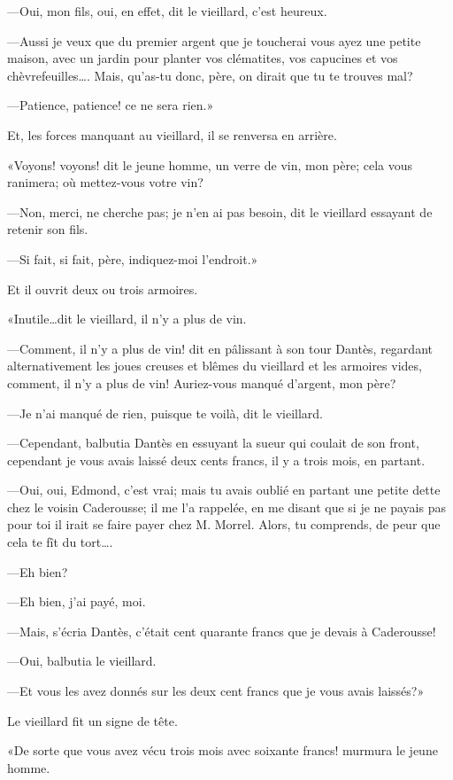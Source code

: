—Oui, mon fils, oui, en effet, dit le vieillard, c'est heureux.

—Aussi je veux que du premier argent que je toucherai vous ayez une petite maison, avec un jardin pour planter vos clématites, vos capucines et vos chèvrefeuilles\dots. Mais, qu'as-tu donc, père, on dirait que tu te trouves mal?

—Patience, patience! ce ne sera rien.»

Et, les forces manquant au vieillard, il se renversa en arrière.

«Voyons! voyons! dit le jeune homme, un verre de vin, mon père; cela vous ranimera; où mettez-vous votre vin?

—Non, merci, ne cherche pas; je n'en ai pas besoin, dit le vieillard essayant de retenir son fils.

—Si fait, si fait, père, indiquez-moi l'endroit.»

Et il ouvrit deux ou trois armoires.

«Inutile\dots dit le vieillard, il n'y a plus de vin.

—Comment, il n'y a plus de vin! dit en pâlissant à son tour Dantès, regardant alternativement les joues creuses et blêmes du vieillard et les armoires vides, comment, il n'y a plus de vin! Auriez-vous manqué d'argent, mon père?

—Je n'ai manqué de rien, puisque te voilà, dit le vieillard.

—Cependant, balbutia Dantès en essuyant la sueur qui coulait de son front, cependant je vous avais laissé deux cents francs, il y a trois mois, en partant.

—Oui, oui, Edmond, c'est vrai; mais tu avais oublié en partant une petite dette chez le voisin Caderousse; il me l'a rappelée, en me disant que si je ne payais pas pour toi il irait se faire payer chez M. Morrel. Alors, tu comprends, de peur que cela te fît du tort\dots.

—Eh bien?

—Eh bien, j'ai payé, moi.

—Mais, s'écria Dantès, c'était cent quarante francs que je devais à Caderousse!

—Oui, balbutia le vieillard.

—Et vous les avez donnés sur les deux cent francs que je vous avais laissés?»

Le vieillard fit un signe de tête.

«De sorte que vous avez vécu trois mois avec soixante francs! murmura le jeune homme.

